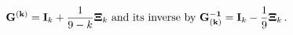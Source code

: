 \begin{equation}
\label{partmetric}
 {\bf G^{(k)}}={\bf I}_k +
\frac{1}{9-k}{\bf\Xi}_k \ {\rm and \ its\  inverse \ by }\ {\bf G^{-1}_{(k)}}={\bf I}_k
-
\frac{1}{9}{\bf\Xi}_k\, .
\end{equation} 
